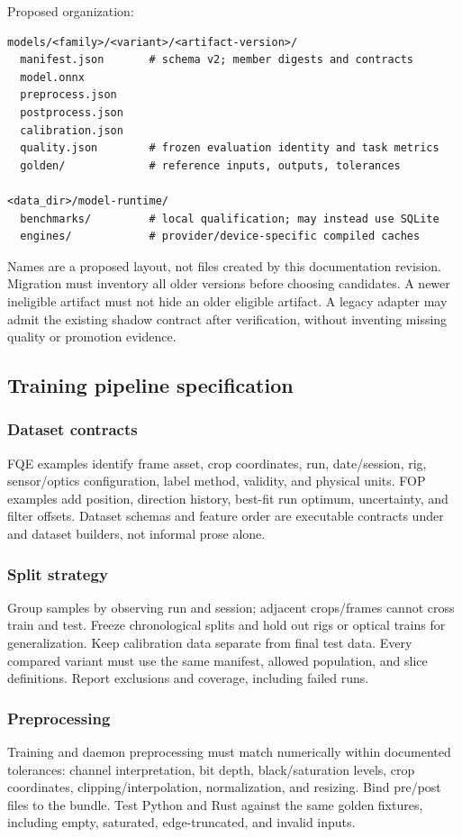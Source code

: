 \documentclass[11pt,a4paper]{article}
\newcommand{\code}[1]{\texttt{\detokenize{#1}}}
\begin{document}
Proposed organization:
\begin{lstlisting}
models/<family>/<variant>/<artifact-version>/
  manifest.json       # schema v2; member digests and contracts
  model.onnx
  preprocess.json
  postprocess.json
  calibration.json
  quality.json        # frozen evaluation identity and task metrics
  golden/             # reference inputs, outputs, tolerances

<data_dir>/model-runtime/
  benchmarks/         # local qualification; may instead use SQLite
  engines/            # provider/device-specific compiled caches
\end{lstlisting}
Names are a proposed layout, not files created by this documentation revision.
Migration must inventory all older versions before choosing candidates. A
newer ineligible artifact must not hide an older eligible artifact. A legacy
adapter may admit the existing shadow contract after verification, without
inventing missing quality or promotion evidence.

\subsection{Training pipeline specification}
\subsubsection{Dataset contracts}
FQE examples identify frame asset, crop coordinates, run, date/session, rig,
sensor/optics configuration, label method, validity, and physical units. FOP
examples add position, direction history, best-fit run optimum, uncertainty,
and filter offsets. Dataset schemas and feature order are executable contracts
under \code{ml/contracts} and dataset builders, not informal prose alone.

\subsubsection{Split strategy}
Group samples by observing run and session; adjacent crops/frames cannot cross
train and test. Freeze chronological splits and hold out rigs or optical trains
for generalization. Keep calibration data separate from final test data.
Every compared variant must use the same manifest, allowed population, and
slice definitions. Report exclusions and coverage, including failed runs.

\subsubsection{Preprocessing}
Training and daemon preprocessing must match numerically within documented
tolerances: channel interpretation, bit depth, black/saturation levels,
crop coordinates, clipping/interpolation, normalization, and resizing. Bind
pre/post files to the bundle. Test Python and Rust against the same golden
fixtures, including empty, saturated, edge-truncated, and invalid inputs.
\end{document}
